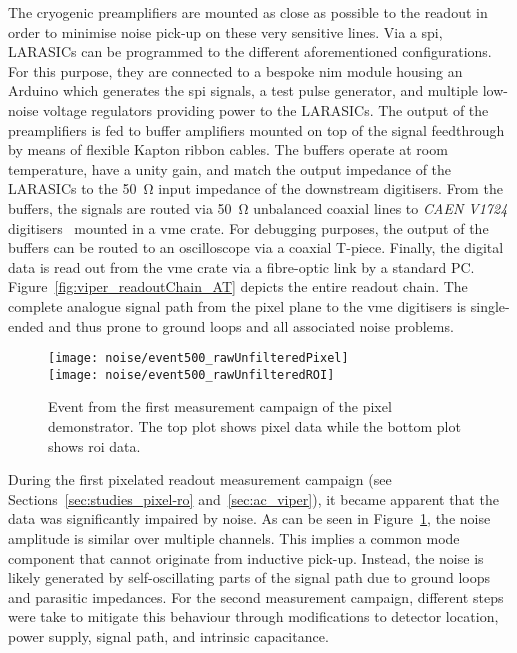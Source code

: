 The cryogenic preamplifiers are mounted as close as possible to the readout in order to minimise noise pick-up on these very sensitive lines.
Via a \gls{spi}, LARASICs can be programmed to the different aforementioned configurations.
For this purpose, they are connected to a bespoke \gls{nim} module housing an Arduino which generates the \gls{spi} signals, a test pulse generator, and multiple low-noise voltage regulators providing power to the LARASICs.
The output of the preamplifiers is fed to buffer amplifiers mounted on top of the signal feedthrough by means of flexible Kapton ribbon cables.
The buffers operate at room temperature, have a unity gain, and match the output impedance of the LARASICs to the \SI{50}{\ohm} input impedance of the downstream digitisers.
From the buffers, the signals are routed via \SI{50}{\ohm} unbalanced coaxial lines to \emph{CAEN V1724} digitisers~\cite{caen_adc} mounted in a \gls{vme} crate.
For debugging purposes, the output of the buffers can be routed to an oscilloscope via a coaxial T-piece.
Finally, the digital data is read out from the \gls{vme} crate via a fibre-optic link by a standard PC.
Figure~\ref{fig:viper_readoutChain_AT} depicts the entire readout chain.
The complete analogue signal path from the pixel plane to the \gls{vme} digitisers is single-ended and thus prone to ground loops and all associated noise problems.

\begin{figure}[htb]
	\centering
	\texttt{[image: noise/event500\_rawUnfilteredPixel]}\\
	\texttt{[image: noise/event500\_rawUnfilteredROI]}
	\caption[Event from first pixel demonstrator measurement campaign]{%
		Event from the first measurement campaign of the pixel demonstrator.
		The top plot shows pixel data while the bottom plot shows \acrshort{roi} data.
	}
	\label{fig:electronics_event-run1}
\end{figure}

During the first pixelated readout measurement campaign (see Sections~\ref{sec:studies_pixel-ro} and~\ref{sec:ac_viper}), it became apparent that the data was significantly impaired by noise.
As can be seen in Figure~\ref{fig:electronics_event-run1}, the noise amplitude is similar over multiple channels.
This implies a common mode component that cannot originate from inductive pick-up.
Instead, the noise is likely generated by self-oscillating parts of the signal path due to ground loops and parasitic impedances.
For the second measurement campaign, different steps were take to mitigate this behaviour through modifications to detector location, power supply, signal path, and intrinsic capacitance.

